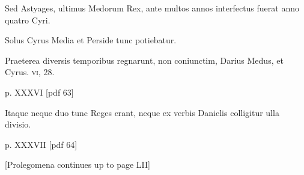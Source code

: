 \begin{parnumbers}
Sed Astyages, ultimus Medorum Rex, ante multos
annos interfectus fuerat anno quatro Cyri.

Solus Cyrus Media et
Perside tunc potiebatur.

Praeterea diversis temporibus regnarunt,
non coniunctim, Darius Medus, et Cyrus. \textsc{vi}, 28.

\clearpage
p. XXXVI [pdf 63]

Itaque neque
duo tunc Reges erant, neque ex verbis Danielis colligitur ulla divisio.



\clearpage
p. XXXVII [pdf 64]


[Prolegomena continues up to page LII]

\end{parnumbers}
